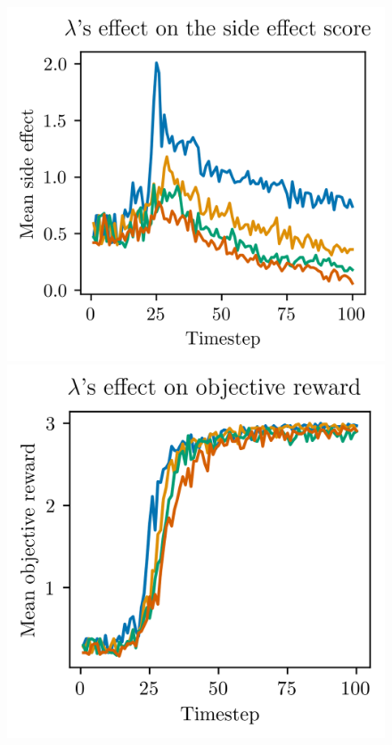 \documentclass[12pt,A4]{report}
\theoremstyle{definition}
\begin{document}
\begin{figure}[H]
  \centering
  \includegraphics{"./figures/static_8x8_results_side_effects.png"}
  \includegraphics{"./figures/static_8x8_results_avg_obj.png"}\\

\end{figure}
\end{document}
